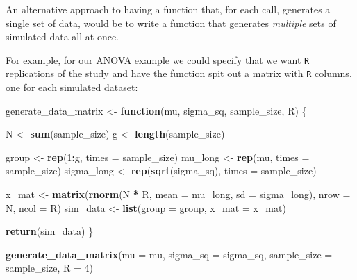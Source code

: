 \documentclass[
]{book}
\newenvironment{Shaded}{\begin{snugshade}}{\end{snugshade}}
\newcommand{\AttributeTok}[1]{\textcolor[rgb]{0.13,0.29,0.53}{#1}}
\newcommand{\ControlFlowTok}[1]{\textcolor[rgb]{0.13,0.29,0.53}{\textbf{#1}}}
\newcommand{\DecValTok}[1]{\textcolor[rgb]{0.00,0.00,0.81}{#1}}
\newcommand{\FunctionTok}[1]{\textcolor[rgb]{0.13,0.29,0.53}{\textbf{#1}}}
\newcommand{\NormalTok}[1]{#1}
\newcommand{\OtherTok}[1]{\textcolor[rgb]{0.56,0.35,0.01}{#1}}
\newcommand{\SpecialCharTok}[1]{\textcolor[rgb]{0.81,0.36,0.00}{\textbf{#1}}}
\begin{document}
An alternative approach to having a function that, for each call, generates a single set of data, would be to write a function that generates \emph{multiple} sets of simulated data all at once.

For example, for our ANOVA example we could specify that we want \texttt{R} replications of the study and have the function spit out a matrix with \texttt{R} columns, one for each simulated dataset:

\begin{Shaded}
\begin{Highlighting}[]
\NormalTok{generate\_data\_matrix }\OtherTok{\textless{}{-}} \ControlFlowTok{function}\NormalTok{(mu, sigma\_sq, sample\_size, R) \{}

\NormalTok{  N }\OtherTok{\textless{}{-}} \FunctionTok{sum}\NormalTok{(sample\_size) }
\NormalTok{  g }\OtherTok{\textless{}{-}} \FunctionTok{length}\NormalTok{(sample\_size) }
  
\NormalTok{  group }\OtherTok{\textless{}{-}} \FunctionTok{rep}\NormalTok{(}\DecValTok{1}\SpecialCharTok{:}\NormalTok{g, }\AttributeTok{times =}\NormalTok{ sample\_size) }
\NormalTok{  mu\_long }\OtherTok{\textless{}{-}} \FunctionTok{rep}\NormalTok{(mu, }\AttributeTok{times =}\NormalTok{ sample\_size)}
\NormalTok{  sigma\_long }\OtherTok{\textless{}{-}} \FunctionTok{rep}\NormalTok{(}\FunctionTok{sqrt}\NormalTok{(sigma\_sq), }\AttributeTok{times =}\NormalTok{ sample\_size) }

\NormalTok{  x\_mat }\OtherTok{\textless{}{-}} \FunctionTok{matrix}\NormalTok{(}\FunctionTok{rnorm}\NormalTok{(N }\SpecialCharTok{*}\NormalTok{ R, }\AttributeTok{mean =}\NormalTok{ mu\_long, }\AttributeTok{sd =}\NormalTok{ sigma\_long),}
                  \AttributeTok{nrow =}\NormalTok{ N, }\AttributeTok{ncol =}\NormalTok{ R)}
\NormalTok{  sim\_data }\OtherTok{\textless{}{-}} \FunctionTok{list}\NormalTok{(}\AttributeTok{group =}\NormalTok{ group, }\AttributeTok{x\_mat =}\NormalTok{ x\_mat)}
    
  \FunctionTok{return}\NormalTok{(sim\_data)}
\NormalTok{\}}

\FunctionTok{generate\_data\_matrix}\NormalTok{(}\AttributeTok{mu =}\NormalTok{ mu, }\AttributeTok{sigma\_sq =}\NormalTok{ sigma\_sq,}
                     \AttributeTok{sample\_size =}\NormalTok{ sample\_size, }\AttributeTok{R =} \DecValTok{4}\NormalTok{)}
\end{Highlighting}
\end{Shaded}
\end{document}
